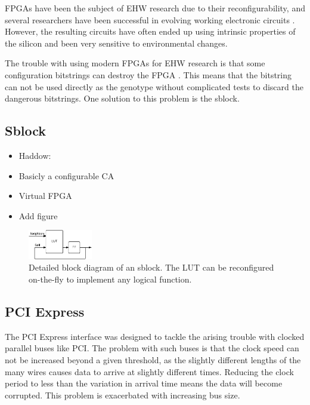 FPGAs have been the subject of EHW research due to their reconfigurability, and several researchers have been successful in evolving working electronic circuits \cite{huelsbergen1998evolution} \cite{thompson1997evolved}.
However, the resulting circuits have often ended up using intrinsic properties of the silicon and been very sensitive to environmental changes.

The trouble with using modern FPGAs for EHW research is that some configuration bitstrings can destroy the FPGA \cite{ug380} \cite{xapp151}.
This means that the bitstring can not be used directly as the genotype without complicated tests to discard the dangerous bitstrings.
One solution to this problem is the sblock. 

\subsection{Sblock}

\begin{itemize}
    \item Haddow: \cite{haddow2000sblock}
    \item Basicly a configurable CA
    \item Virtual FPGA
    \item Add figure
\end{itemize}

\begin{figure}[!ht]
    \centering
    \includegraphics[width=0.25\textwidth]{figures/sblock}
    \caption{Detailed block diagram of an sblock. The LUT can be reconfigured on-the-fly to implement any logical function.}
    \label{fig:sblock}
\end{figure}

\subsection{PCI Express}

The PCI Express interface was designed to tackle the arising trouble with clocked parallel buses like PCI.
The problem with such buses is that the clock speed can not be increased beyond a given threshold, as the slightly different lengths of the many wires causes data to arrive at slightly different times.
Reducing the clock period to less than the variation in arrival time means the data will become corrupted.
This problem is exacerbated with increasing bus size.

